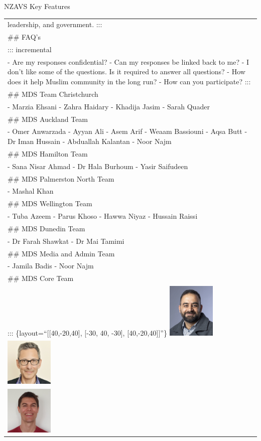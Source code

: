 \documentclass[
  ignorenonframetext,
  aspectratio=169,
]{beamer}
\begin{document}
\begin{frame}{NZAVS Key Features}
\begin{longtable}[]{@{}
  >{\raggedright\arraybackslash}p{}@{}}
leadership, and government. ::: \\
\#\# FAQ's \\
::: incremental \\
- Are my responses confidential? - Can my responses be linked back to
me? - I don't like some of the questions. Is it required to answer all
questions? - How does it help Muslim community in the long run? - How
can you participate? ::: \\
\#\# MDS Team Christchurch \\
- Marzia Ehsani - Zahra Haidary - Khadija Jasim - Sarah Quader \\
\#\# MDS Auckland Team \\
- Omer Anwarzada - Ayyan Ali - Asem Arif - Weaam Bassiouni - Aqsa Butt -
Dr Iman Hussain - Abduallah Kalantan - Noor Najm \\
\#\# MDS Hamilton Team \\
- Sana Nisar Ahmad - Dr Hala Burhoum - Yasir Saifudeen \\
\#\# MDS Palmerston North Team \\
- Mashal Khan \\
\#\# MDS Wellington Team \\
- Tuba Azeem - Parus Khoso - Hawwa Niyaz - Hussain Raissi \\
\#\# MDS Dunedin Team \\
- Dr Farah Shawkat - Dr Mai Tamimi \\
\#\# MDS Media and Admin Team \\
- Jamila Badis - Noor Najm \\
\#\# MDS Core Team \\
::: \{layout=``{[}{[}40,-20,40{]}, {[}-30, 40, -30{]},
{[}40,-20,40{]}{]}''\}
\includegraphics[width=0.9in,height=\textheight]{figs/usman-a.jpeg} \\
\includegraphics[width=0.9in,height=\textheight]{figs/joe-b.jpg} \\
\includegraphics[width=0.9in,height=\textheight]{figs/chris-s.png} \\

\end{longtable}
\end{frame}
\end{document}
